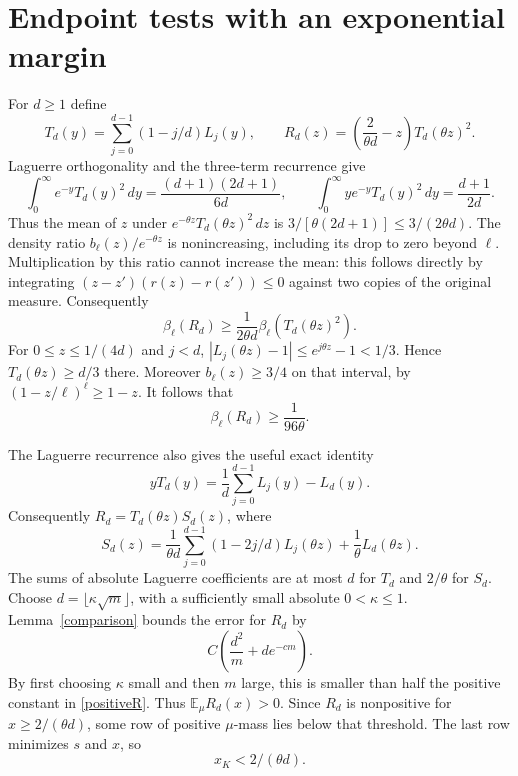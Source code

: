 \documentclass[11pt]{article}
\newcommand{\E}{\mathbb E}
\begin{document}
\section*{Endpoint tests with an exponential margin}
For $d\ge1$ define
\[
 T_d(y)=\sum_{j=0}^{d-1}(1-j/d)L_j(y),\qquad
 R_d(z)=\left(\frac{2}{\theta d}-z\right)T_d(\theta z)^2.
\]
Laguerre orthogonality and the three-term recurrence give
\[
 \int_0^\infty e^{-y}T_d(y)^2\,dy
   =\frac{(d+1)(2d+1)}{6d},\qquad
 \int_0^\infty ye^{-y}T_d(y)^2\,dy
   =\frac{d+1}{2d}.
\]
Thus the mean of $z$ under $e^{-\theta z}T_d(\theta z)^2\,dz$
is $3/[\theta(2d+1)]\le3/(2\theta d)$.
The density ratio $b_\ell(z)/e^{-\theta z}$ is nonincreasing,
including its drop to zero beyond $\ell$. Multiplication by this
ratio cannot increase the mean: this follows directly by integrating
$(z-z')(r(z)-r(z'))\le0$ against two copies of the original measure.
Consequently
\[
 \beta_\ell(R_d)
 \ge\frac1{2\theta d}\beta_\ell(T_d(\theta z)^2).
\]
For $0\le z\le1/(4d)$ and $j<d$,
$|L_j(\theta z)-1|\le e^{j\theta z}-1<1/3$.
Hence $T_d(\theta z)\ge d/3$ there. Moreover $b_\ell(z)\ge3/4$
on that interval, by $(1-z/\ell)^\ell\ge1-z$.
It follows that
\begin{equation}\label{positiveR}
 \beta_\ell(R_d)\ge\frac1{96\theta}.
\end{equation}

The Laguerre recurrence also gives the useful exact identity
\[
 yT_d(y)=\frac1d\sum_{j=0}^{d-1}L_j(y)-L_d(y).
\]
Consequently $R_d=T_d(\theta z)S_d(z)$, where
\[
 S_d(z)=\frac1{\theta d}\sum_{j=0}^{d-1}(1-2j/d)L_j(\theta z)
                      +\frac1\theta L_d(\theta z).
\]
The sums of absolute Laguerre coefficients are at most $d$ for $T_d$
and $2/\theta$ for $S_d$.
Choose $d=\lfloor\kappa\sqrt m\rfloor$, with a sufficiently small
absolute $0<\kappa\le1$. Lemma~\ref{comparison} bounds the error for
$R_d$ by
\[
 C\left(\frac{d^2}{m}+d e^{-cm}\right).
\]
By first choosing $\kappa$ small and then $m$ large, this is smaller
than half the positive constant in \eqref{positiveR}.
Thus $\E_\mu R_d(x)>0$. Since $R_d$ is nonpositive for
$x\ge2/(\theta d)$, some row of positive $\mu$-mass lies below
that threshold. The last row minimizes $s$ and $x$, so
\begin{equation}\label{lastx}
 x_K<2/(\theta d).
\end{equation}
\end{document}
